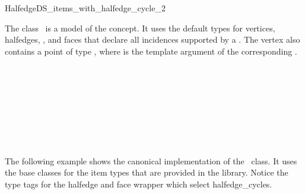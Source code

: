 
\ccRefPageBegin



\begin{ccRefClass}{HalfedgeDS_items_with_halfedge_cycle_2}
\label{pageHalfedgeDSitemsWithHalfedgeCycleRef}

\ccDefinition
  
The class \ccRefName\ is a model of the  concept.
It uses the default types for vertices, halfedges, , and faces 
that declare all incidences supported by a .  The vertex
also contains a point of type , where  
is the template argument of the corresponding .


\ccIsModel


\ccSeeAlso

\\
\\
\\
\\
\\
\\
\\

\ccExample

The following example shows the canonical implementation of the
\ccRefName\ class. It uses the base classes for the item types that
are provided in the library.
Notice the type tags for the halfedge and face wrapper which
select halfedge\_cycles.


\end{ccRefClass}
